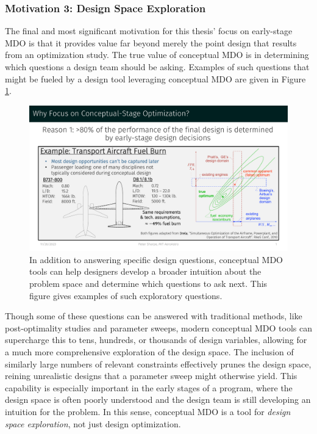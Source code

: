 
\subsubsection*{Motivation 3: Design Space Exploration}

The final and most significant motivation for this thesis' focus on early-stage MDO is that it provides value far beyond merely the point design that results from an optimization study. The true value of conceptual MDO is in determining which questions a design team should be asking. Examples of such questions that might be fueled by a design tool leveraging conceptual MDO are given in Figure \ref{fig:motivation_3}.

\begin{figure}[htbp!]
    \centering
    \includegraphics[page=5,trim=0cm 3cm 0cm 6.2cm, clip, width=\textwidth]{../figures/motivation_for_conceptual_MDO_focus.pdf}
    \caption{In addition to answering specific design questions, conceptual MDO tools can help designers develop a broader intuition about the problem space and determine which questions to ask next. This figure gives examples of such exploratory questions.}
    \label{fig:motivation_3}
\end{figure}

Though some of these questions can be answered with traditional methods, like post-optimality studies and parameter sweeps, modern conceptual MDO tools can supercharge this to tens, hundreds, or thousands of design variables, allowing for a much more comprehensive exploration of the design space. The inclusion of similarly large numbers of relevant constraints effectively prunes the design space, reining unrealistic designs that a parameter sweep might otherwise yield. This capability is especially important in the early stages of a program, where the design space is often poorly understood and the design team is still developing an intuition for the problem. In this sense, conceptual MDO is a tool for \textit{design space exploration}, not just design optimization.
